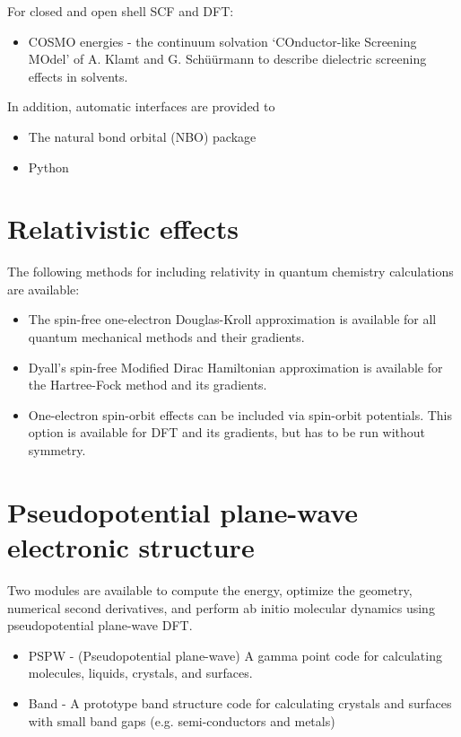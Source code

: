 For closed and open shell SCF and DFT:
\begin{itemize}
\item COSMO energies - the continuum solvation `COnductor-like Screening MOdel'
    of A. Klamt and G. Sch\"{u}\"{u}rmann to describe dielectric screening effects in
    solvents.
\end{itemize}

In addition, automatic interfaces are provided to
\begin{itemize}
\item The natural bond orbital (NBO) package
\item Python
\end{itemize}

\section{Relativistic effects}

The following methods for including relativity in quantum chemistry 
calculations are available:
\begin{itemize}
\item The spin-free one-electron Douglas-Kroll approximation is available for all 
 quantum mechanical methods and their gradients.
\item Dyall's spin-free Modified Dirac Hamiltonian approximation is available 
 for the Hartree-Fock method and its gradients.
\item One-electron spin-orbit effects can be included via spin-orbit potentials.
 This option is available for DFT and its gradients, but has to be run without 
 symmetry.
\end{itemize}

\section{Pseudopotential plane-wave electronic structure}

Two modules are available to compute the energy, optimize the
geometry, numerical second derivatives, and perform ab initio 
molecular dynamics using pseudopotential plane-wave DFT.

\begin{itemize}
\item PSPW - (Pseudopotential plane-wave) A gamma point code for calculating
molecules, liquids, crystals, and surfaces.
\item Band - A prototype band structure code for calculating crystals and 
surfaces with small band gaps (e.g. semi-conductors and metals)
\end{itemize}

